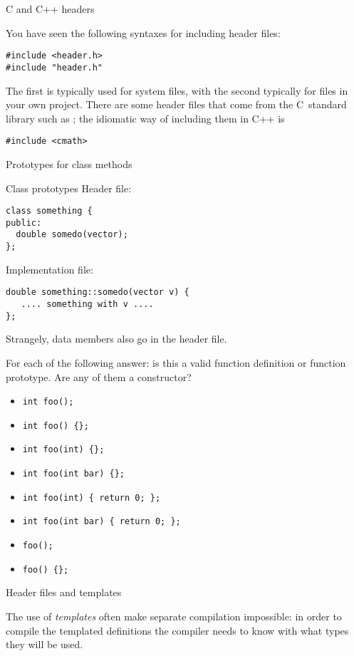  {C and C++ headers}

You have seen the following syntaxes for including header files:
\begin{verbatim}
#include <header.h>
#include "header.h"
\end{verbatim}
The first is typically used for system files, with the second
typically for files in your own project. There are some header files
that come from the C~standard library such as ; the
idiomatic way of including them in C++ is
\begin{verbatim}
#include <cmath>
\end{verbatim}

 {Prototypes for class methods}

\begin{block}{Class prototypes}
  \label{sl:class-proto}
  Header file:
\begin{verbatim}
class something {
public:
  double somedo(vector);
};
\end{verbatim}

Implementation file:
\begin{verbatim}
double something::somedo(vector v) {
   .... something with v ....
};
\end{verbatim}
Strangely, data members also go in the header file.
\end{block}

\begin{review}
  \label{rev:proto-c-cpp}
  For each of the following answer: is this a valid function
  definition or function prototype. Are any of them a constructor?
  \begin{itemize}
  \item \verb+int foo();+
  \item \verb+int foo() {};+
  \item \verb+int foo(int) {};+
  \item \verb+int foo(int bar) {};+
  \item \verb+int foo(int) { return 0; };+
  \item \verb+int foo(int bar) { return 0; };+
  \item \verb+foo();+
  \item \verb+foo() {};+
  \end{itemize}
\end{review}

 {Header files and templates}

The use of \emph{templates}
often make separate compilation impossible: in order to compile the
templated definitions the compiler needs to know with what types they
will be used.

